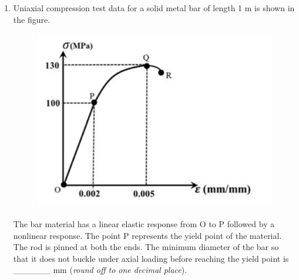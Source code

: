 \documentclass[12pt,onecolumn]{article}
\begin{document}
\begin{enumerate}
    \item Uniaxial compression test data for a solid metal bar of length 1 m is shown in the figure.
          \begin{figure}[H]
              \centering
              \includegraphics[scale=0.4]{q38s2}
              \label{fig:q38s2}
          \end{figure}
          The bar material has a linear elastic response from O to P followed by a nonlinear response. The point P represents the yield point of the material. The rod is pinned at both the ends. The minimum diameter of the bar so that it does not buckle under axial loading before reaching the yield point is \_\_\_\_\_\_ mm (\textit{round off to one decimal place}).


\end{enumerate}
\end{document}

